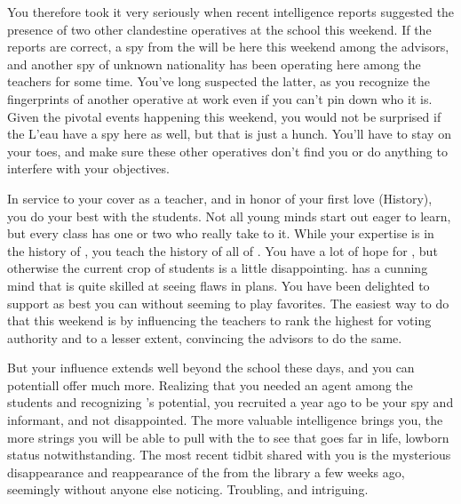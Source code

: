 \documentclass[char]{GL2020}
\begin{document}
You therefore took it very seriously when recent intelligence reports suggested the presence of two other clandestine operatives at the school this weekend. If the reports are correct, a spy from the \pTech{} will be here this weekend among the advisors, and another spy of unknown nationality has been operating here among the teachers for some time. You've long suspected the latter, as you recognize the fingerprints of another operative at work even if you can't pin down who it is. Given the pivotal events happening this weekend, you would not be surprised if the L'eau have a spy here as well, but that is just a hunch. You'll have to stay on your toes, and make sure these other operatives don't find you or do anything to interfere with your objectives.

In service to your cover as a teacher, and in honor of your first love (History), you do your best with the students. Not all young minds start out eager to learn, but every class has one or two who really take to it. While your expertise is in the history of \pFarm{}, you teach the history of all of \pEarth{}. You have a lot of hope for \cLibAssist{\full}, but otherwise the current crop of students is a little disappointing. \cLibAssist{} has a cunning mind that is quite skilled at seeing flaws in plans. You have been delighted to support \cLibAssist{\them} as best you can without seeming to play favorites. The easiest way to do that this weekend is by influencing the \pTech{} teachers to rank \cLibAssist{} the highest for voting authority and to a lesser extent, convincing the \pFarm{} advisors to do the same.

But your influence extends well beyond the school these days, and you can potentiall offer \cLibAssist{} much more. Realizing that you needed an agent among the students and recognizing \cLibAssist{}'s potential, you recruited \cLibAssist{\them} a year ago to be your spy and informant, and \cLibAssist{\they} \cLibAssist{\have} not disappointed. The more valuable intelligence \cLibAssist{\they} brings you, the more strings you will be able to pull with the \cQueen{\Majesty} to see that \cLibAssist{} goes far in life, \cLibAssist{\their} lowborn status notwithstanding. The most recent tidbit \cLibAssist{\they} shared with you is the mysterious disappearance and reappearance of the \iScythe{} from the library a few weeks ago, seemingly without anyone else noticing. Troubling, and intriguing.
\end{document}
